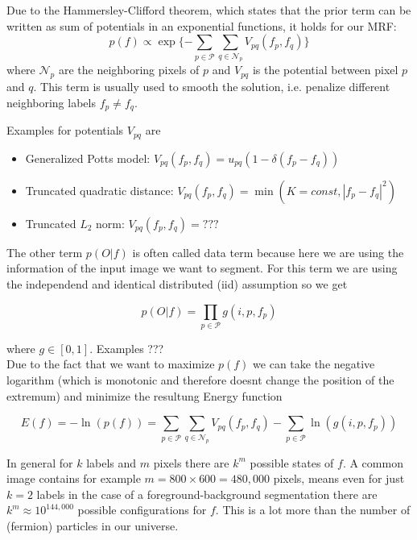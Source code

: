 \documentclass{scrartcl}[12pt, halfparskip]
\begin{document}
Due to the Hammersley-Clifford theorem, which states that the prior term can be written as sum of potentials in an exponential functions, it holds for our MRF:
\begin{equation}
	p(f) \propto \exp\{ - \sum\limits_{p \in \mathcal{P}} \sum\limits_{q \in \mathcal{N}_p} V_{pq} (f_p, f_q) \}
\end{equation}
where $\mathcal{N}_p$ are the neighboring pixels of $p$ and $V_{pq}$ is the potential between pixel $p$ and $q$. This term is usually used to smooth the solution, i.e. penalize different neighboring labels $f_p \neq f_q$.

Examples for potentials $V_{pq}$ are
\begin{itemize}
	\item Generalized Potts model: $V_{pq}(f_p, f_q) = u_{pq} (1 - \delta(f_p - f_q))$
	\item Truncated quadratic distance: $V_{pq}(f_p, f_q) = \min (K=const, |f_p - f_q|^2)$
	\item Truncated $L_2$ norm: $V_{pq}(f_p, f_q) = ???$
\end{itemize}

The other term $p(O|f)$ is often called data term because here we are using the information of the input image we want to segment. For this term we are using the independend and identical distributed (iid) assumption so we get

\begin{equation}
	p(O|f) = \prod\limits_{p \in \mathcal{P}} g(i, p, f_p)
\end{equation}

where $g \in [0, 1]$. Examples ??? \\

Due to the fact that we want to maximize $p(f)$ we can take the negative logarithm (which is monotonic and therefore doesnt change the position of the extremum) and minimize the resultung Energy function

\begin{equation}
E(f) = - \ln(p(f)) = \sum\limits_{p \in \mathcal{P}} \sum\limits_{q \in \mathcal{N}_p} V_{pq} (f_p, f_q) - \sum\limits_{p \in \mathcal{P}} \ln(g(i, p, f_p))
\end{equation}
\label{eq:energy-function}

In general for $k$ labels and $m$ pixels there are $k^m$ possible states of $f$. A common image contains for example $m = 800 \times 600 = 480,000$ pixels, means even for just $k = 2$ labels in the case of a foreground-background segmentation there are $k^m \approx 10^{144,000}$ possible configurations for $f$. This is a lot more than the number of (fermion) particles in our universe.
\end{document}

